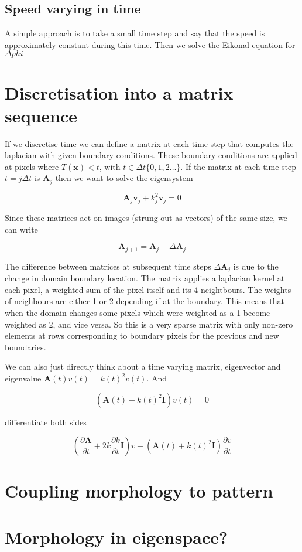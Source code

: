 \documentclass{report}
\renewcommand{\vec}[1]{\mathbf{#1}}
\newcommand{\mat}{\mathbf}
\begin{document}
\subsection{Speed varying in time}
A simple approach is to take a small time step and say that the speed is
approximately constant during this time. Then we solve the Eikonal equation for
$\Delta phi$


\section{Discretisation into a matrix sequence}
If we discretise time we can define a matrix at each time step that computes the
laplacian with given boundary conditions. These boundary conditions are applied
at pixels where $T(\vec{x})<t$, with $t \in \Delta t\{0,1,2\dots\}$. If the
matrix at each time step $t=j\Delta t$ is $\mat{A}_j$ then we want to solve the
eigensystem

\begin{equation}
\mat{A}_j \vec{v}_j + k_j^2 \vec{v}_j = 0
\end{equation}

Since these matrices act on images (strung out as vectors) of the same size, we
can write

\begin{equation}
\mat{A}_{j+1} = \mat{A}_{j} + \Delta\mat{A}_j
\end{equation}

The difference between matrices at subsequent time steps $\Delta\mat{A}_j$ is
due to the change in domain boundary location. The matrix applies a laplacian
kernel at each pixel, a weighted sum of the pixel itself and its 4 neightbours.
The weights of neighbours are either 1 or 2 depending if at the boundary.
This means that when the domain changes some pixels which were weighted as a 1
become weighted as 2, and vice versa. So this is a very sparse matrix with only
non-zero elements at rows corresponding to boundary pixels for the previous and
new boundaries.

We can also just directly think about a time varying matrix, eigenvector and
eigenvalue $\mat{A}(t)v(t) = k(t)^2 v(t)$. And 

\begin{equation}
(\mat{A}(t) + k(t)^2\mat{I}) v(t) = 0
\end{equation}

differentiate both sides

\begin{equation}
\left( \frac{\partial\mat{A}}{\partial t} + 2k\frac{\partial k}{\partial t}
\mat{I} \right) v 
+
(\mat{A}(t) + k(t)^2\mat{I}) \frac{\partial v}{\partial t}
\end{equation}

\section{Coupling morphology to pattern}

\section{Morphology in eigenspace?}

\section{}
\end{document}
